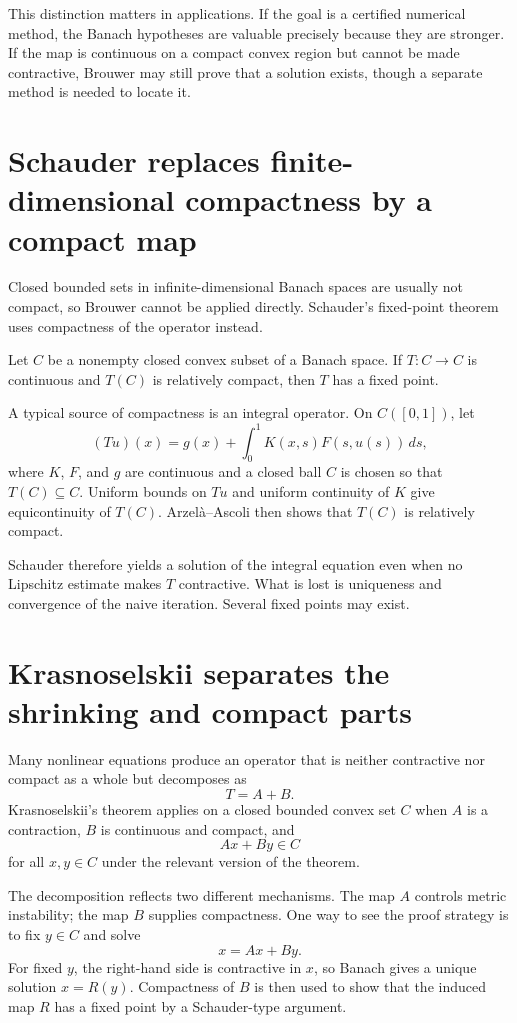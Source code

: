 This distinction matters in applications.  If the goal is a certified numerical method, the Banach hypotheses are valuable precisely because they are stronger.  If the map is continuous on a compact convex region but cannot be made contractive, Brouwer may still prove that a solution exists, though a separate method is needed to locate it.

\section{Schauder replaces finite-dimensional compactness by a compact map}

Closed bounded sets in infinite-dimensional Banach spaces are usually not compact, so Brouwer cannot be applied directly.  Schauder's fixed-point theorem uses compactness of the operator instead.

\begin{theorem}
Let \(C\) be a nonempty closed convex subset of a Banach space.  If \(T:C\to C\) is continuous and \(T(C)\) is relatively compact, then \(T\) has a fixed point.
\end{theorem}

A typical source of compactness is an integral operator.  On \(C([0,1])\), let
\[
  (Tu)(x)=g(x)+\int_0^1K(x,s)F(s,u(s))\,ds,
\]
where \(K\), \(F\), and \(g\) are continuous and a closed ball \(C\) is chosen so that \(T(C)\subseteq C\).  Uniform bounds on \(Tu\) and uniform continuity of \(K\) give equicontinuity of \(T(C)\).  Arzelà--Ascoli then shows that \(T(C)\) is relatively compact.

Schauder therefore yields a solution of the integral equation even when no Lipschitz estimate makes \(T\) contractive.  What is lost is uniqueness and convergence of the naive iteration.  Several fixed points may exist.

\section{Krasnoselskii separates the shrinking and compact parts}

Many nonlinear equations produce an operator that is neither contractive nor compact as a whole but decomposes as
\[
  T=A+B.
\]
Krasnoselskii's theorem applies on a closed bounded convex set \(C\) when \(A\) is a contraction, \(B\) is continuous and compact, and
\[
  Ax+By\in C
\]
for all \(x,y\in C\) under the relevant version of the theorem.

The decomposition reflects two different mechanisms.  The map \(A\) controls metric instability; the map \(B\) supplies compactness.  One way to see the proof strategy is to fix \(y\in C\) and solve
\[
  x=Ax+By.
\]
For fixed \(y\), the right-hand side is contractive in \(x\), so Banach gives a unique solution \(x=R(y)\).  Compactness of \(B\) is then used to show that the induced map \(R\) has a fixed point by a Schauder-type argument.

